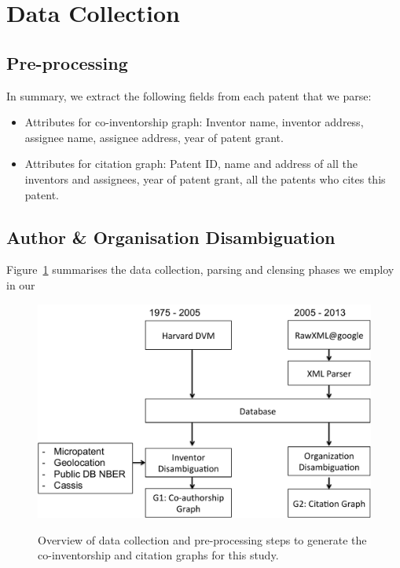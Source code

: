 \section{Data Collection}

\subsection{Pre-processing}


In summary, we extract the following fields from each patent that we parse:

\begin{itemize}
\item {Attributes for co-inventorship graph}:
Inventor name, inventor address, assignee name, assignee address, year of patent grant.

\item {Attributes for citation graph}:
Patent ID, name and address of all the inventors and assignees, year of patent grant, all the patents who cites this patent.
\end{itemize}



\subsection{Author \& Organisation Disambiguation}


Figure~\ref{process} summarises the data collection, parsing and clensing phases we employ in our 

\begin{figure}[H]
		  \centering	
          \includegraphics[scale=0.6]{../figures/process.pdf}
          \label{process}
          \caption{Overview of data collection and pre-processing steps to generate the co-inventorship and citation graphs for this study.}
\end{figure}



